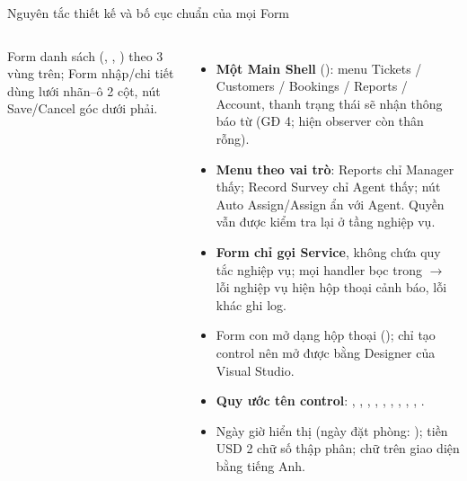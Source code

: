 \begin{frame}{Nguyên tắc thiết kế và bố cục chuẩn của mọi Form}
\begin{columns}[T]
\vspace{1mm}
{\tiny Form danh sách (, , ) theo 3 vùng trên; Form nhập/chi tiết dùng lưới nhãn--ô 2 cột, nút Save/Cancel góc dưới phải.\par}
\scriptsize
\begin{itemize}
  \item \textbf{Một Main Shell} (): menu Tickets / Customers / Bookings / Reports / Account, thanh trạng thái sẽ nhận thông báo từ  (GĐ 4; hiện observer còn thân rỗng).
  \item \textbf{Menu theo vai trò}: Reports chỉ Manager thấy; Record Survey chỉ Agent thấy; nút Auto Assign/Assign ẩn với Agent. Quyền vẫn được kiểm tra lại ở tầng nghiệp vụ.
  \item \textbf{Form chỉ gọi Service}, không chứa quy tắc nghiệp vụ; mọi handler bọc trong  $\to$ lỗi nghiệp vụ hiện hộp thoại cảnh báo, lỗi khác ghi log.
  \item Form con mở dạng hộp thoại ();  chỉ tạo control nên mở được bằng Designer của Visual Studio.
  \item \textbf{Quy ước tên control}: , , , , , , , , , .
  \item Ngày giờ hiển thị  (ngày đặt phòng: ); tiền USD 2 chữ số thập phân; chữ trên giao diện bằng tiếng Anh.
\end{itemize}
\end{columns}
\end{frame}

